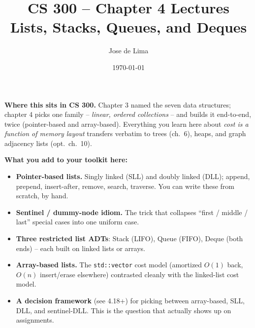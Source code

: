\documentclass[11pt]{article}
\title{CS 300 -- Chapter 4 Lectures\\\large Lists, Stacks, Queues, and Deques}
\author{Jose de Lima}
\date{\today}
\begin{document}
\maketitle

\begin{ideabox}
\textbf{Where this sits in CS 300.} Chapter 3 named the seven data
structures; chapter 4 picks one family -- \emph{linear, ordered
collections} -- and builds it end-to-end, twice (pointer-based and
array-based). Everything you learn here about \emph{cost is a function
of memory layout} transfers verbatim to trees (ch.~6), heaps, and graph
adjacency lists (opt.\ ch.~10).

\textbf{What you add to your toolkit here:}
\begin{itemize}
    \item \textbf{Pointer-based lists.} Singly linked (SLL) and doubly
          linked (DLL); append, prepend, insert-after, remove, search,
          traverse. You can write these from scratch, by hand.
    \item \textbf{Sentinel / dummy-node idiom.} The trick that collapses
          ``first / middle / last'' special cases into one uniform case.
    \item \textbf{Three restricted list ADTs}: Stack (LIFO), Queue
          (FIFO), Deque (both ends) -- each built on linked lists or
          arrays.
    \item \textbf{Array-based lists.} The \texttt{std::vector} cost
          model (amortized $O(1)$ back, $O(n)$ insert/erase elsewhere)
          contrasted cleanly with the linked-list cost model.
    \item \textbf{A decision framework} (see 4.18+) for picking between
          array-based, SLL, DLL, and sentinel-DLL. This is the question
          that actually shows up on assignments.
\end{itemize}


\end{ideabox}
\end{document}
